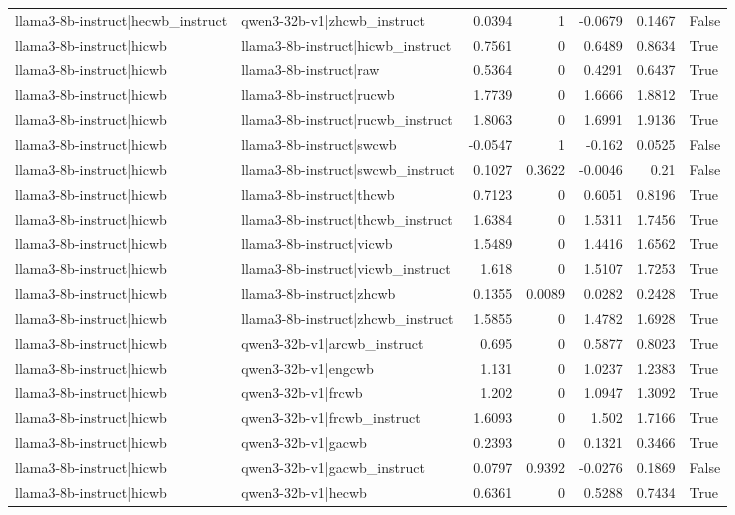 \begin{table}
\begin{tabular}{l l r r r r l}
llama3-8b-instruct|hecwb_instruct & qwen3-32b-v1|zhcwb_instruct & 0.0394 & 1 & -0.0679 & 0.1467 & False \\
llama3-8b-instruct|hicwb & llama3-8b-instruct|hicwb_instruct & 0.7561 & 0 & 0.6489 & 0.8634 & True \\
llama3-8b-instruct|hicwb & llama3-8b-instruct|raw & 0.5364 & 0 & 0.4291 & 0.6437 & True \\
llama3-8b-instruct|hicwb & llama3-8b-instruct|rucwb & 1.7739 & 0 & 1.6666 & 1.8812 & True \\
llama3-8b-instruct|hicwb & llama3-8b-instruct|rucwb_instruct & 1.8063 & 0 & 1.6991 & 1.9136 & True \\
llama3-8b-instruct|hicwb & llama3-8b-instruct|swcwb & -0.0547 & 1 & -0.162 & 0.0525 & False \\
llama3-8b-instruct|hicwb & llama3-8b-instruct|swcwb_instruct & 0.1027 & 0.3622 & -0.0046 & 0.21 & False \\
llama3-8b-instruct|hicwb & llama3-8b-instruct|thcwb & 0.7123 & 0 & 0.6051 & 0.8196 & True \\
llama3-8b-instruct|hicwb & llama3-8b-instruct|thcwb_instruct & 1.6384 & 0 & 1.5311 & 1.7456 & True \\
llama3-8b-instruct|hicwb & llama3-8b-instruct|vicwb & 1.5489 & 0 & 1.4416 & 1.6562 & True \\
llama3-8b-instruct|hicwb & llama3-8b-instruct|vicwb_instruct & 1.618 & 0 & 1.5107 & 1.7253 & True \\
llama3-8b-instruct|hicwb & llama3-8b-instruct|zhcwb & 0.1355 & 0.0089 & 0.0282 & 0.2428 & True \\
llama3-8b-instruct|hicwb & llama3-8b-instruct|zhcwb_instruct & 1.5855 & 0 & 1.4782 & 1.6928 & True \\
llama3-8b-instruct|hicwb & qwen3-32b-v1|arcwb_instruct & 0.695 & 0 & 0.5877 & 0.8023 & True \\
llama3-8b-instruct|hicwb & qwen3-32b-v1|engcwb & 1.131 & 0 & 1.0237 & 1.2383 & True \\
llama3-8b-instruct|hicwb & qwen3-32b-v1|frcwb & 1.202 & 0 & 1.0947 & 1.3092 & True \\
llama3-8b-instruct|hicwb & qwen3-32b-v1|frcwb_instruct & 1.6093 & 0 & 1.502 & 1.7166 & True \\
llama3-8b-instruct|hicwb & qwen3-32b-v1|gacwb & 0.2393 & 0 & 0.1321 & 0.3466 & True \\
llama3-8b-instruct|hicwb & qwen3-32b-v1|gacwb_instruct & 0.0797 & 0.9392 & -0.0276 & 0.1869 & False \\
llama3-8b-instruct|hicwb & qwen3-32b-v1|hecwb & 0.6361 & 0 & 0.5288 & 0.7434 & True \\

\end{tabular}
\end{table}
